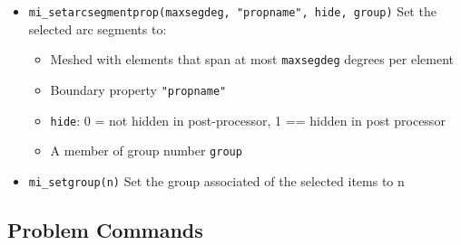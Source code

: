 \begin{itemize}
\item{\tt mi\_setarcsegmentprop(maxsegdeg, "propname", hide, group)} Set the
selected arc segments to:
\begin{itemize}
\item Meshed with elements that span at most {\tt maxsegdeg} degrees per
element
\item Boundary property {\tt "propname"}
\item {\tt hide}: 0 =  not hidden in post-processor, 1 == hidden in post processor
\item A member of group number {\tt group}
\end{itemize}


\item{\tt mi\_setgroup(n)} Set the group associated of the selected items to n

\end{itemize}

\subsection{Problem Commands}

